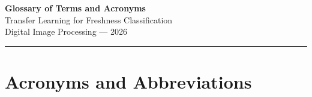 \documentclass[12pt, a4paper]{article}
\begin{document}
\begin{center}
    {\LARGE\bfseries Glossary of Terms and Acronyms}\\[0.5em]
    {\large Transfer Learning for Freshness Classification}\\[0.3em]
    {\normalsize Digital Image Processing --- 2026}
\end{center}

\vspace{1em}
\hrule
\vspace{1.5em}

\section{Acronyms and Abbreviations}
\end{document}
